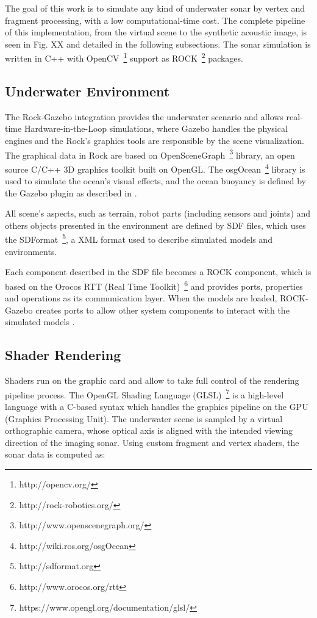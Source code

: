 \documentclass[final,5p,times]{elsarticle}
\begin{document}
The goal of this work is to simulate any kind of underwater sonar by vertex and fragment processing, with a low computational-time cost. The complete pipeline of this implementation, from the virtual scene to the synthetic acoustic image, is seen in Fig. XX and detailed in the following subsections. The sonar simulation is written in C++ with OpenCV~\footnote{http://opencv.org/} support as ROCK~\footnote{http://rock-robotics.org/} packages.

\subsection{Underwater Environment}
\label{dev:uwscene}

The Rock-Gazebo integration \cite{watanabe2015} provides the underwater scenario and allows real-time Hardware-in-the-Loop simulations, where Gazebo handles the physical engines and the Rock's graphics tools are responsible by the scene visualization. The graphical data in Rock are based on OpenSceneGraph~\footnote{http://www.openscenegraph.org/} library, an open source C/C++ 3D graphics toolkit built on OpenGL. The osgOcean~\footnote{http://wiki.ros.org/osgOcean} library is used to simulate the ocean's visual effects, and the ocean buoyancy is defined by the Gazebo plugin as described in \cite{watanabe2015}.

All scene's aspects, such as terrain, robot parts (including sensors and joints) and others objects presented in the environment are defined by SDF files, which uses the SDFormat~\footnote{http://sdformat.org}, a XML format used to describe simulated models and environments.

Each component described in the SDF file becomes a ROCK component, which is based on the Orocos RTT (Real Time Toolkit)~\footnote{http://www.orocos.org/rtt} and provides ports, properties and operations as its communication layer. When the models are loaded, ROCK-Gazebo creates ports to allow other system components to interact with the simulated models \cite{cerqueira2016}.

\subsection{Shader Rendering}
\label{dev:shader}

Shaders run on the graphic card and allow to take full control of the rendering pipeline process. The OpenGL Shading Language (GLSL)~\footnote{https://www.opengl.org/documentation/glsl/} is a high-level language with a C-based syntax which handles the graphics pipeline on the GPU (Graphics Processing Unit). The underwater scene is sampled by a virtual orthographic camera, whose optical axis is aligned with the intended viewing direction of the imaging sonar. Using custom fragment and vertex shaders, the sonar data is computed as:
\end{document}
